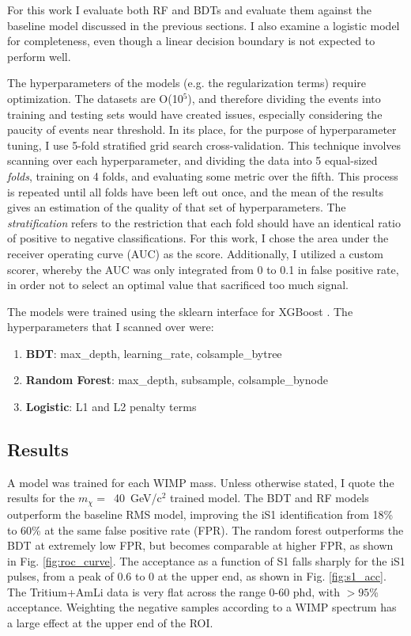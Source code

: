 For this work I evaluate both RF and BDTs and evaluate them against the baseline model discussed in the previous sections.
I also examine a logistic model for completeness, even though a linear decision boundary is not expected to perform well.

The hyperparameters of the models (e.g. the regularization terms) require optimization.
The datasets are O(10$^5$), and therefore dividing the events into training and testing sets would have created issues, especially considering the paucity of events near threshold.
In its place, for the purpose of hyperparameter tuning, I use 5-fold stratified grid search cross-validation.
This technique involves scanning over each hyperparameter, and dividing the data into 5 equal-sized \textit{folds}, training on 4 folds, and evaluating some metric over the fifth.
This process is repeated until all folds have been left out once, and the mean of the results gives an estimation of the quality of that set of hyperparameters.
The \textit{stratification} refers to the restriction that each fold should have an identical ratio of positive to negative classifications.
For this work, I chose the area under the receiver operating curve (AUC) as the score.
Additionally, I utilized a custom scorer, whereby the AUC was only integrated from 0 to 0.1 in false positive rate, in order not to select an optimal value that sacrificed too much signal.

The models were trained using the sklearn interface for XGBoost \cite{chen_xgboost_2016}.
The hyperparameters that I scanned over were:
\begin{enumerate}
    \item \textbf{BDT}: max\_depth, learning\_rate, colsample\_bytree
    \item \textbf{Random Forest}: max\_depth, subsample, colsample\_bynode
    \item \textbf{Logistic}: L1 and L2 penalty terms
\end{enumerate}
\subsection{Results}

A model was trained for each WIMP mass.
Unless otherwise stated, I quote the results for the $m_{\chi}=$~40~GeV/c$^2$ trained model.
The BDT and RF models outperform the baseline RMS model, improving the iS1 identification from 18\% to 60\% at the same false positive rate (FPR).
The random forest outperforms the BDT at extremely low FPR, but becomes comparable at higher FPR, as shown in Fig. \ref{fig:roc_curve}.
The acceptance as a function of S1 falls sharply for the iS1 pulses, from a peak of 0.6 to 0 at the upper end, as shown in Fig. \ref{fig:s1_acc}.
The Tritium+AmLi data is very flat across the range 0-60 phd, with $>95$\% acceptance.
Weighting the negative samples according to a WIMP spectrum has a large effect at the upper end of the ROI.

